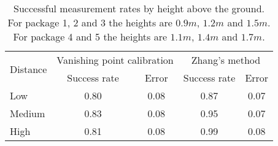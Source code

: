 \begin{table}
\centering
\begin{tabular}{@{} l *4c @{}}
\toprule
\multirow{2}{*}{Distance} & \multicolumn{2}{c}{Vanishing point calibration} & \multicolumn{2}{c}{Zhang's method}\\ 
\cmidrule(r){2-3}
\cmidrule(r){4-5}
& Success rate & Error & Success rate & Error \\
\midrule
 Low 		& 0.80 & 0.08 & 0.87 & 0.07 \\
 Medium 	& 0.83 & 0.08 & 0.95 & 0.07 \\
 High		& 0.81 & 0.08 & 0.99 & 0.08 \\

\bottomrule
 \end{tabular}
 \caption{Successful measurement rates by height above the ground. For package 1, 2 and 3 the heights are $0.9m$, $1.2m$ and $1.5m$. For package 4 and 5 the heights are $1.1m$, $1.4m$ and $1.7m$.} 
\label{table:key_measurement_by_height}
\end{table}